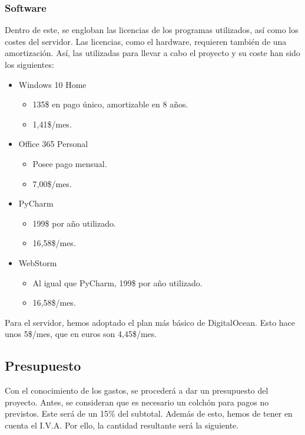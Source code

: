 \subsubsection{Software}
Dentro de este, se engloban las licencias de los programas utilizados, así como los costes del servidor.
Las licencias, como el hardware, requieren también de una amortización. Así, las utilizadas para llevar a cabo el proyecto y su coste han sido los siguientes:
\begin{itemize}
    \item Windows 10 Home
    \begin{itemize}
        \item 135\$ en pago único, amortizable en 8 años.
        \item 1,41\$/mes.
    \end{itemize}
    \item Office 365 Personal
    \begin{itemize}
        \item Posee pago mensual.
        \item 7,00\$/mes.
    \end{itemize}
    \item PyCharm
    \begin{itemize}
        \item 199\$ por año utilizado.
        \item 16,58\$/mes.
    \end{itemize}
    \item WebStorm
    \begin{itemize}
        \item Al igual que PyCharm, 199\$ por año utilizado.
        \item 16,58\$/mes.
    \end{itemize}
\end{itemize}

Para el servidor, hemos adoptado el plan más básico de DigitalOcean. Esto hace unos 5\$/mes, que en euros son 4,45\$/mes.

\subsection{Presupuesto}
Con el conocimiento de los gastos, se procederá a dar un presupuesto del proyecto. Antes, se consideran que es necesario un colchón para pagos no previstos. Este será de un 15\% del subtotal. Además de esto, hemos de tener en cuenta el I.V.A. Por ello, la cantidad resultante será la siguiente.

